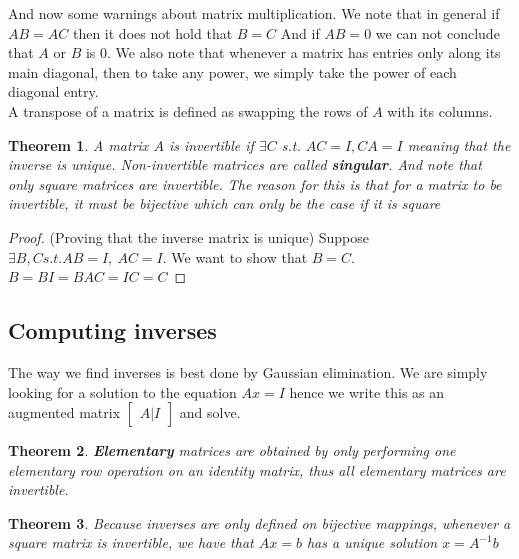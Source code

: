 \documentclass{article}
\newtheorem{thm}{Theorem}[subsection]
\numberwithin{equation}{subsection}
\begin{document}
And now some warnings about matrix multiplication. We note that in general if $AB = AC$ then it does not hold that $B=C$ And if $AB=0$ we can not conclude that $A$ or $B$ is $0$. We also note that whenever a matrix has entries only along its main diagonal, then to take any power, we simply take the power of each diagonal entry. 
\\
A transpose of a matrix is defined as swapping the rows of $A$ with its columns. \\
\begin{thm}
A matrix $A$ is invertible if $\exists C$ s.t. $AC = I , CA=I$ meaning that the inverse is unique. Non-invertible matrices are called \textbf{singular}. And note that only square matrices are invertible. The reason for this is that for a matrix to be invertible, it must be bijective which can only be the case if it is square 
\end{thm}

\begin{proof}(Proving that the inverse matrix is unique)
Suppose $\exists B,C s.t. AB = I, \ AC=I$. We want to show that $B = C$.
\\
$B = BI = BAC = IC = C$
\end{proof}


\subsection{Computing inverses}

The way we find inverses is best done by Gaussian elimination. We are simply looking for a solution to the equation $Ax=I$ hence we write this as an augmented matrix $\begin{bmatrix}
    A | I
\end{bmatrix}$ and solve. 

\begin{thm}
\textbf{Elementary} matrices are obtained by only performing one elementary row operation on an identity matrix, thus all elementary matrices are invertible.
\end{thm}

\begin{thm}
Because inverses are only defined on bijective mappings, whenever a square matrix is invertible, we have that $Ax=b$ has a unique solution $x = A^{-1}b$
\end{thm}
\end{document}
